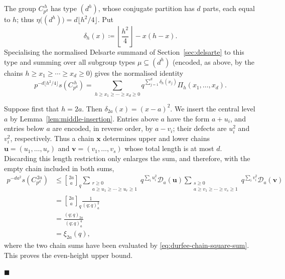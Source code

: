 \documentclass[a4paper,11pt,reqno]{amsart}
\theoremstyle{plain}
\theoremstyle{remark}
\numberwithin{equation}{section}
\newcommand{\qgauss}[2]{\genfrac{[}{]}{0pt}{}{#1}{#2}_q}
\renewcommand{\leq}{\leqslant}
\renewcommand{\geq}{\geqslant}
\newenvironment{proofof}{{\bf Proof. }}{\hfill $\blacksquare$ \\}
\begin{document}
\begin{proofof}
The group $C_{p^d}^{\,h}$ has type $(d^h)$, whose conjugate partition has $d$
parts, each equal to $h$; thus $\eta\bigl((d^h)\bigr)=d\lfloor h^2/4\rfloor$.
Put
\[
        \delta_h(x)\coloneqq
        \left\lfloor\frac{h^2}{4}\right\rfloor-x(h-x).
\]
Specialising the normalised Delsarte summand of Section~\ref{sec:delsarte} to
this type and summing over all subgroup types $\mu\subseteq(d^h)$ (encoded,
as above, by the chains $h\geq x_1\geq\cdots\geq x_d\geq 0$) gives the
normalised identity
\[
        p^{-d\lfloor h^2/4\rfloor}s(C_{p^d}^{\,h})
        =
        \sum_{h\geq x_1\geq\cdots\geq x_d\geq 0}
        q^{\sum_{j=1}^{d}\delta_h(x_j)}\Pi_h(x_1,\ldots,x_d).
\]

Suppose first that $h=2a$. Then $\delta_{2a}(x)=(x-a)^2$. We insert the central
level $a$ by Lemma~\ref{lem:middle-insertion}. Entries above $a$ have the form
$a+u_i$, and entries below $a$ are encoded, in reverse order, by $a-v_i$; their
defects are $u_i^2$ and $v_i^2$, respectively. Thus a chain $\mathbf x$
determines upper and lower chains $\mathbf u=(u_1,\ldots,u_r)$ and
$\mathbf v=(v_1,\ldots,v_s)$ whose total length is at most $d$. Discarding this
length restriction only enlarges the sum, and therefore, with the empty chain
included in both sums,
\[
\begin{aligned}
        p^{-da^2}s(C_{p^d}^{\,2a})
        &\leq
        \qgauss{2a}{a}
        \sum_{\substack{r\geq 0\\ a\geq u_1\geq\cdots\geq u_r\geq 1}}
        q^{\sum_i u_i^2}\mathcal D_a(\mathbf u)  
        \sum_{\substack{s\geq 0\\ a\geq v_1\geq\cdots\geq v_s\geq 1}}
        q^{\sum_i v_i^2}\mathcal D_a(\mathbf v) \\
        &=
        \qgauss{2a}{a}\frac{1}{(q;q)_a^2}       \\
        &=
        \frac{(q;q)_{2a}}{(q;q)_a^4}            \\
        &=\xi_{2a}(q),
\end{aligned}
\]
where the two chain sums have been evaluated by
\eqref{eq:durfee-chain-square-sum}. This proves the even-height upper bound.


\end{proofof}
\end{document}
